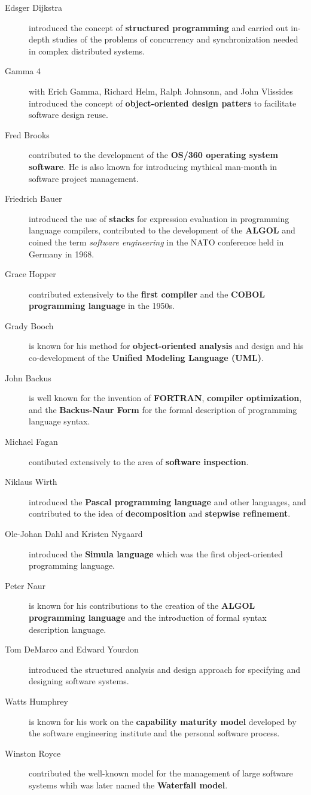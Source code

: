 \documentclass[9pt,twocolumn]{article}
\begin{document}
\begin{description}
    \item[Edsger Dijkstra] introduced the concept of \textbf{structured programming} and carried out in-depth studies of the problems of concurrency and synchronization needed in complex distributed systems.
    \item[Gamma 4] with Erich Gamma, Richard Helm, Ralph Johnsonn, and John Vlissides introduced the concept of \textbf{object-oriented design patters} to facilitate software design reuse.
    \item[Fred Brooks] contributed to the development of the \textbf{OS/360 operating system software}. He is also known for introducing mythical man-month in software project management.
    \item[Friedrich Bauer] introduced the use of \textbf{stacks} for expression evaluation in programming language compilers, contributed to the development of the \textbf{ALGOL} and coined the term \emph{software engineering} in the NATO conference held in Germany in 1968.
    \item[Grace Hopper] contributed extensively to the \textbf{first compiler} and the \textbf{COBOL programming language} in the 1950s.
    \item[Grady Booch] is known for his method for \textbf{object-oriented analysis} and design and his co-development of the \textbf{Unified Modeling Language (UML)}.
    \item[John Backus] is well known for the invention of \textbf{FORTRAN}, \textbf{compiler optimization}, and the \textbf{Backus-Naur Form} for the formal description of programming language syntax.
    \item[Michael Fagan] contibuted extensively to the area of \textbf{software inspection}.
    \item[Niklaus Wirth] introduced the \textbf{Pascal programming language} and other languages, and contributed to the idea of \textbf{decomposition} and \textbf{stepwise refinement}.
    \item[Ole-Johan Dahl and Kristen Nygaard] introduced the \textbf{Simula language} which was the first object-oriented programming language.
    \item[Peter Naur] is known for his contributions to the creation of the \textbf{ALGOL programming language} and the introduction of formal syntax description language.
    \item[Tom DeMarco and Edward Yourdon] introduced the structured analysis and design approach for specifying and designing software systems.
    \item[Watts Humphrey] is known for his work on the \textbf{capability maturity model} developed by the software engineering institute and the personal software process.
    \item[Winston Royce] contributed the well-known model for the management of large software systems whih was later named the \textbf{Waterfall model}.
  \end{description}
\end{document}
